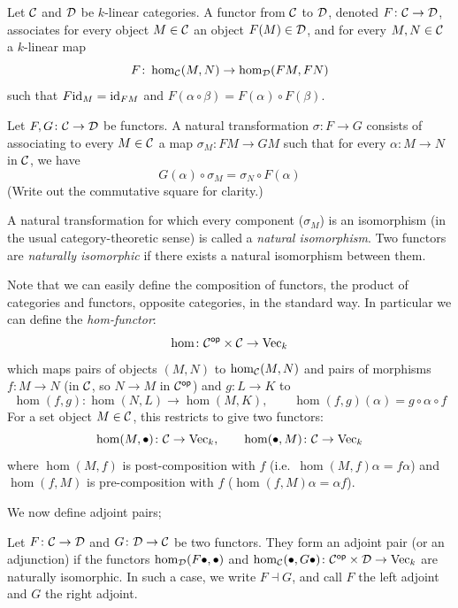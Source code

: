 \bdefn

    Let ${{\cal C}}$ and ${{\cal D}}$ be $k$-linear categories.
    A {\emphcolor functor} from ${{\cal C}}$ to ${{\cal D}}$, denoted $F\colon{{\cal C}}\to{{\cal D}}$, associates for every object $M\in{{\cal C}}$ an object $F(M)\in{{\cal D}}$, and for every $M,N\in{{\cal C}}$ a $k$-linear map
    $$ F\colon\hom_{{\cal C}}(M,N) \to \hom_{{\cal D}}(FM,FN) $$
    such that $F{\rm id}_M={\rm id}_{FM}$ and $F(\alpha\circ\beta)=F(\alpha)\circ F(\beta)$.

\edefn

\bdefn

    Let $F,G\colon{{\cal C}}\to{{\cal D}}$ be functors.
    A {\emphcolor natural transformation} $\sigma\colon F\to G$ consists of associating to every $M\in{{\cal C}}$ a map $\sigma_M\colon FM\to GM$ such that for every $\alpha\colon M\to N$ in ${{\cal C}}$,
    we have
    $$ G(\alpha)\circ\sigma_M = \sigma_N\circ F(\alpha) $$
    (Write out the commutative square for clarity.)

\edefn

A natural transformation for which every component ($\sigma_M$) is an isomorphism (in the usual category-theoretic sense) is called a {\it natural isomorphism}.
Two functors are {\it naturally isomorphic} if there exists a natural isomorphism between them.

Note that we can easily define the composition of functors, the product of categories and functors, opposite categories, in the standard way.
In particular we can define the {\it hom-functor}:
$$ \hom\colon{{\cal C}}^{\sf op}\times{{\cal C}}\to{\rm Vec}_k $$
which maps pairs of objects $(M,N)$ to $\hom_{{\cal C}}(M,N)$ and pairs of morphisms $f\colon M\to N$ (in ${{\cal C}}$, so $N\to M$ in ${{\cal C}}^{\sf op}$) and $g\colon L\to K$ to
$$ \hom(f,g)\colon\hom(N,L)\to\hom(M,K),\qquad \hom(f,g)(\alpha) = g\circ\alpha\circ f $$
For a set object $M\in{{\cal C}}$, this restricts to give two functors:
$$ \hom(M,\bullet)\colon{{\cal C}}\to{\rm Vec}_k,\qquad\hom(\bullet,M)\colon{{\cal C}}\to{\rm Vec}_k $$
where $\hom(M,f)$ is post-composition with $f$ (i.e.\ $\hom(M,f)\alpha=f\alpha$) and $\hom(f,M)$ is pre-composition with $f$ ($\hom(f,M)\alpha=\alpha f$).

We now define adjoint pairs;

\bdefn

    Let $F\colon{{\cal C}}\to{{\cal D}}$ and $G\colon{{\cal D}}\to{{\cal C}}$ be two functors.
    They form an {\emphcolor adjoint pair} (or an {\emphcolor adjunction}) if the functors $\hom_{{\cal D}}(F\bullet,\bullet)$ and $\hom_{{\cal C}}(\bullet,G\bullet)\colon{{\cal C}}^{\sf op}\times{{\cal D}}\to{\rm Vec}_k$ are naturally isomorphic.
    In such a case, we write $F\dashv G$, and call $F$ the {\emphcolor left adjoint} and $G$ the {\emphcolor right adjoint}.

